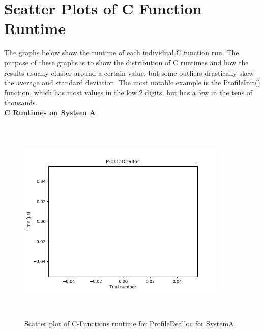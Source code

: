\documentclass{article}
\begin{document}
\section{Scatter Plots of C Function Runtime}
The graphs below show the runtime of each individual C function run. The purpose of these graphs is to show the distribution of C runtimes and how the results usually cluster around a certain value, but some outliers drastically skew the average and standard deviation. The most notable example is the ProfileInit() function, which has most values in the low 2 digits, but has a few in the tens of thousands.\\

\textbf{C Runtimes on System A}
\begin{figure}[H]
	\centering
	\includegraphics[width=10cm,height=10cm,keepaspectratio]{RuntimeResults_SystemA/CFunctions/ProfileDealloc_scatter.png}
	\caption{Scatter plot of C-Functions runtime for ProfileDealloc for SystemA}
	\label{fig:C-Functions|ProfileDealloc|SystemA}
\end{figure}
\end{document}
